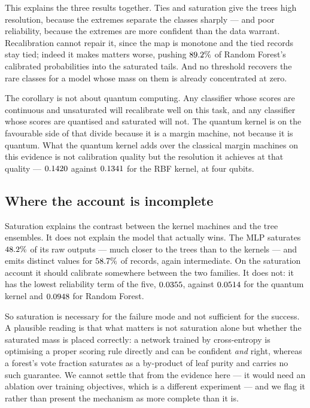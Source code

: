 \documentclass[journal]{IEEEtran}
\begin{document}
This explains the three results together. Ties and saturation give the trees
high resolution, because the extremes separate the classes sharply --- and
poor reliability, because the extremes are more confident than the data
warrant. Recalibration cannot repair it, since the map is monotone and the
tied records stay tied; indeed it makes matters worse, pushing
$89.2\%$ of Random Forest's calibrated probabilities into the
saturated tails. And no threshold recovers the rare classes for a model
whose mass on them is already concentrated at zero.

The corollary is not about quantum computing. Any classifier whose scores
are continuous and unsaturated will recalibrate well on this task, and any
classifier whose scores are quantised and saturated will not. The quantum
kernel is on the favourable side of that divide because it is a margin
machine, not because it is quantum. What the quantum kernel adds over the
classical margin machines on this evidence is not calibration quality but
the resolution it achieves at that quality --- $0.1420$ against
$0.1341$ for the RBF kernel, at four qubits.

\subsection{Where the account is incomplete}
Saturation explains the contrast between the kernel machines and the tree
ensembles. It does not explain the model that actually wins. The MLP
saturates $48.2\%$ of its raw outputs --- much closer to the trees
than to the kernels --- and emits distinct values for $58.7\%$
of records, again intermediate. On the saturation account it should
calibrate somewhere between the two families. It does not: it has the
lowest reliability term of the five, $0.0355$, against $0.0514$ for
the quantum kernel and $0.0948$ for Random Forest.

So saturation is necessary for the failure mode and not sufficient for the
success. A plausible reading is that what matters is not saturation alone
but whether the saturated mass is placed correctly: a network trained by
cross-entropy is optimising a proper scoring rule directly and can be
confident \emph{and} right, whereas a forest's vote fraction saturates as a
by-product of leaf purity and carries no such guarantee. We cannot settle
that from the evidence here --- it would need an ablation over training
objectives, which is a different experiment --- and we flag it rather than
present the mechanism as more complete than it is.
\end{document}

